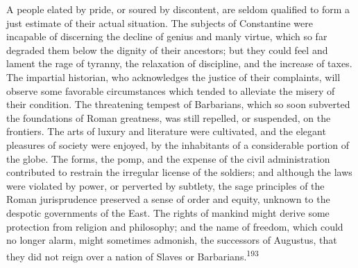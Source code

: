 

A people elated by pride, or soured by discontent, are seldom
qualified to form a just estimate of their actual situation. The
subjects of Constantine were incapable of discerning the decline
of genius and manly virtue, which so far degraded them below the
dignity of their ancestors; but they could feel and lament the
rage of tyranny, the relaxation of discipline, and the increase
of taxes. The impartial historian, who acknowledges the justice
of their complaints, will observe some favorable circumstances
which tended to alleviate the misery of their condition. The
threatening tempest of Barbarians, which so soon subverted the
foundations of Roman greatness, was still repelled, or suspended,
on the frontiers. The arts of luxury and literature were
cultivated, and the elegant pleasures of society were enjoyed, by
the inhabitants of a considerable portion of the globe. The
forms, the pomp, and the expense of the civil administration
contributed to restrain the irregular license of the soldiers;
and although the laws were violated by power, or perverted by
subtlety, the sage principles of the Roman jurisprudence
preserved a sense of order and equity, unknown to the despotic
governments of the East. The rights of mankind might derive some
protection from religion and philosophy; and the name of freedom,
which could no longer alarm, might sometimes admonish, the
successors of Augustus, that they did not reign over a nation of
Slaves or Barbarians.\textsuperscript{193}



